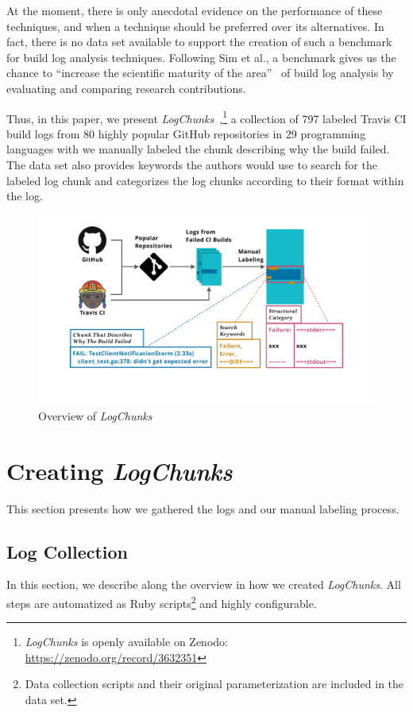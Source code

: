 \documentclass[sigconf]{acmart}
\newcommand{\logchunks}{\emph{LogChunks}\xspace}
\begin{document}
At the moment, there is only anecdotal evidence on the performance of
these techniques, and when a technique should be preferred over its
alternatives.  In fact, there is no data set available to support the
creation of such a benchmark for build log analysis techniques.
Following Sim et al., a benchmark gives us the chance to ``increase
the scientific maturity of the area''~\cite{sim2003using} of build log
analysis by evaluating and comparing research contributions.

Thus, in this paper, we present
\logchunks~\cite{brandt_carolin_2020_3632351},\footnote{\logchunks is
  openly available on Zenodo: \url{https://zenodo.org/record/3632351}} a
collection of 797 labeled Travis CI build logs from 80 highly popular GitHub
repositories in 29 programming languages with  we
manually labeled the chunk describing why the build failed.  The data
set also provides keywords the authors would use to search for the
labeled log chunk and categorizes the log chunks according to their
format within the log.


\begin{figure}[tbp]
	\centering
	\includegraphics[width=1.35\columnwidth, trim={2cm 2.75cm 2cm 0.75cm}, clip]{overview.pdf}
	\caption{Overview of \logchunks}
	\label{fig:lc-overview}
\end{figure}

\section{Creating \logchunks}
This section presents how we gathered the logs and our manual labeling process.
\label{sec:data-collection}

\subsection{Log Collection}
In this section, we describe along the overview in
 how we created \logchunks. All steps are
automatized as Ruby scripts\footnote{Data collection scripts and their original
parameterization are included in the data set.} and highly configurable.
\end{document}
